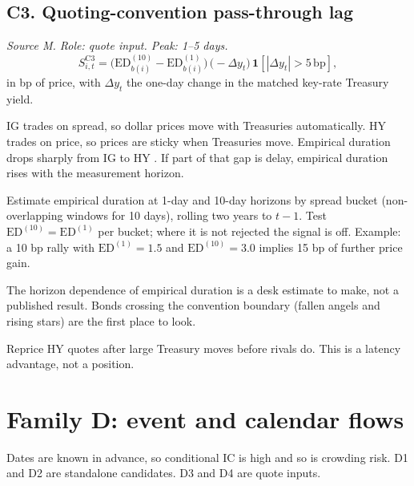 \documentclass[11pt,letterpaper]{article}
\newcommand{\ind}[1]{\mathbf{1}\!\left[#1\right]}
\newcommand{\bp}{\,\mathrm{bp}}
\begin{document}
\subsection{C3. Quoting-convention pass-through lag}
\emph{Source M. Role: quote input. Peak: 1--5 days.}
\begin{equation}
S^{\mathrm{C3}}_{i,t}=\bigl(\mathrm{ED}^{(10)}_{b(i)}-\mathrm{ED}^{(1)}_{b(i)}\bigr)\,\bigl(-\Delta y_t\bigr)\,\ind{|\Delta y_t|>5\bp},
\end{equation}
in bp of price, with $\Delta y_t$ the one-day change in the matched key-rate Treasury yield.
\begin{spec}
\item[Mechanism and evidence.] IG trades on spread, so dollar prices move with Treasuries automatically. HY trades on price, so prices are sticky when Treasuries move. Empirical duration drops sharply from IG to HY \cite{amba2010}. If part of that gap is delay, empirical duration rises with the measurement horizon.
\item[Build.] Estimate empirical duration at 1-day and 10-day horizons by spread bucket (non-overlapping windows for 10 days), rolling two years to $t-1$. Test $\mathrm{ED}^{(10)}=\mathrm{ED}^{(1)}$ per bucket; where it is not rejected the signal is off. Example: a 10 bp rally with $\mathrm{ED}^{(1)}=1.5$ and $\mathrm{ED}^{(10)}=3.0$ implies 15 bp of further price gain.
\item[Status.] The horizon dependence of empirical duration is a desk estimate to make, not a published result. Bonds crossing the convention boundary (fallen angels and rising stars) are the first place to look.
\item[Role in the quote.] Reprice HY quotes after large Treasury moves before rivals do. This is a latency advantage, not a position.
\end{spec}

\section{Family D: event and calendar flows}
\label{sec:famD}

Dates are known in advance, so conditional IC is high and so is crowding risk. D1 and D2 are standalone candidates. D3 and D4 are quote inputs.
\end{document}
